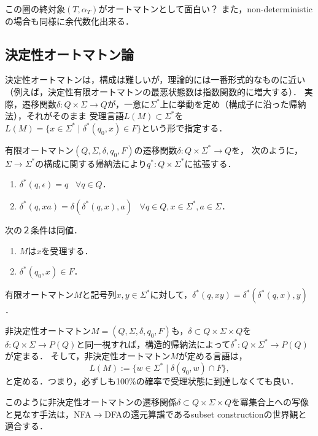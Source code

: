 \documentclass[uplatex, dvipdfmx]{jsreport}
\begin{document}
この圏の終対象$(T,\alpha_T)$がオートマトンとして面白い？
また，non-deterministicの場合も同様に余代数化出来る．

\subsection{決定性オートマトン論}

\begin{screen}
    決定性オートマトンは，構成は難しいが，理論的には一番形式的なものに近い（例えば，決定性有限オートマトンの最悪状態数は指数関数的に増大する）．
    実際，遷移関数$\delta:Q\times\Sigma\to Q$が，一意に$\Sigma^*$上に挙動を定め（構成子に沿った帰納法），それがそのまま
    受理言語$L(M)\subset\Sigma^*$を$L(M)=\{x\in\Sigma^*\mid \delta^*(q_0,x)\in F\}$という形で指定する．
\end{screen}

\begin{definition}
    有限オートマトン$(Q,\Sigma,\delta,q_0,F)$の遷移関数$\delta:Q\times\Sigma^*\to Q$を，
    次のように，$\Sigma\to\Sigma^*$の構成に関する帰納法により$q^*:Q\times\Sigma^*$に拡張する．
    \begin{enumerate}
        \item $\delta^*(q,\epsilon)=q\;\;\;\forall q\in Q$．
        \item $\delta^*(q,xa)=\delta(\delta^*(q,x),a)\;\;\;\forall q\in Q,x\in\Sigma^*,a\in\Sigma$．
    \end{enumerate}
\end{definition}

\begin{proposition}[$M$が$x$を受理することの特徴付け]
    次の２条件は同値．
    \begin{enumerate}
        \item $M$は$x$を受理する．
        \item $\delta^*(q_0,x)\in F$．
    \end{enumerate}
\end{proposition}

\begin{proposition}
    有限オートマトン$M$と記号列$x,y\in\Sigma^*$に対して，$\delta^*(q,xy)=\delta^*(\delta^*(q,x),y)$．
\end{proposition}

\begin{remark}
    非決定性オートマトン$M=(Q,\Sigma,\delta,q_0,F)$も，$\delta\subset Q\times\Sigma\times Q$を$\delta:Q\times\Sigma\to P(Q)$と同一視すれば，構造的帰納法によって$\delta^*:Q\times\Sigma^*\to P(Q)$が定まる．
    そして，非決定性オートマトン$M$が定める言語は，
    \[L(M):=\{w\in\Sigma^*\mid \delta(q_0,w)\cap F\},\]
    と定める．つまり，必ずしも100\%の確率で受理状態に到達しなくても良い．

    このように非決定性オートマトンの遷移関係$\delta\subset Q\times\Sigma\times Q$を冪集合上への写像と見なす手法は，NFA$\to$DFAの還元算譜であるsubset constructionの世界観と適合する．
\end{remark}
\end{document}

